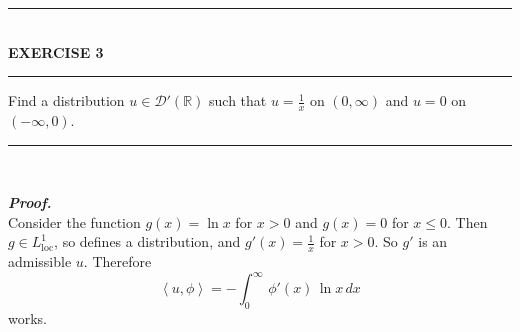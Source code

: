 \documentclass[a4paper,11pt]{article}
\begin{document}
	\begin{flushleft}
		\rule[-0.5ex]{17cm}{2pt}\\
			\textbf{EXERCISE 3}\\
		\rule[1.5ex]{17cm}{0.5pt}
			Find a distribution $u \in \mathcal{D}'(\mathbb{R})$ such that $u = \frac{1}{x}$ on $(0,\infty)$ and $u = 0$ on $(-\infty,0)$.
		\rule[1.0ex]{17cm}{0.5pt}\
	\end{flushleft}
	\textbf{\textit{Proof.}}\\
		Consider the function $g(x) = \ln x$ for $x > 0$ and $g(x) = 0$ for $x \leq 0$. Then $g \in L^1_{\text{loc}}$, so defines a distribution, and $g'(x) = \frac{1}{x}$ for $x > 0$. So $g'$ is an admissible $u$. Therefore
			$$\left<u, \phi\right>
			= - \int_0^\infty\,\phi'(x)\,\ln x \,dx$$
		works.\\
\end{document}
